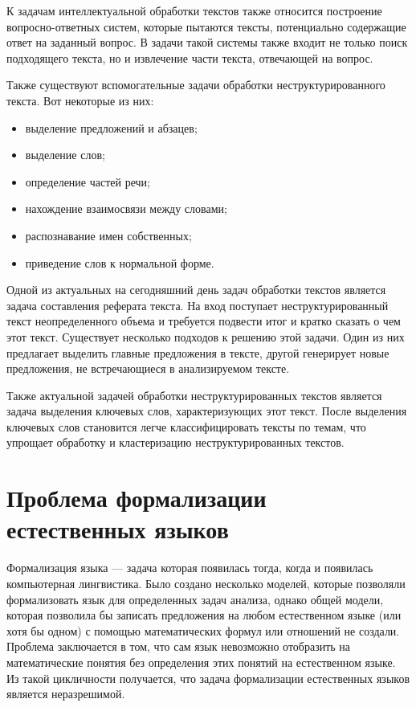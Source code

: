 К задачам интеллектуальной обработки текстов также относится построение вопросно-ответных систем, которые пытаются тексты, потенциально содержащие ответ на заданный вопрос. В задачи такой системы также входит не только поиск подходящего текста, но и извлечение части текста, отвечающей на вопрос.

Также существуют вспомогательные задачи обработки неструктурированного текста. Вот некоторые из них:
\begin{itemize}
    \item выделение предложений и абзацев;
    \item выделение слов;
    \item определение частей речи;
    \item нахождение взаимосвязи между словами;
    \item распознавание имен собственных;
    \item приведение слов к нормальной форме.
\end{itemize}

Одной из актуальных на сегодняшний день задач обработки текстов является задача составления реферата текста. На вход поступает неструктурированный текст неопределенного объема и требуется подвести итог и кратко сказать о чем этот текст. Существует несколько подходов к решению этой задачи. Один из них предлагает выделить главные предложения в тексте, другой генерирует новые предложения, не встречающиеся в анализируемом тексте.

Также актуальной задачей обработки неструктурированных текстов является задача выделения ключевых слов, характеризующих этот текст. После выделения ключевых слов становится легче классифицировать тексты по темам, что упрощает обработку и кластеризацию неструктурированных текстов.

\section{Проблема формализации естественных языков}

Формализация языка --- задача которая появилась тогда, когда и появилась компьютерная лингвистика. Было создано несколько моделей, которые позволяли формализовать язык для определенных задач анализа, однако общей модели, которая позволила бы записать предложения на любом естественном языке (или хотя бы одном) с помощью математических формул или отношений не создали. Проблема заключается в том, что сам язык невозможно отобразить на математические понятия без определения этих понятий на естественном языке. Из такой цикличности получается, что задача формализации естественных языков является неразрешимой.

